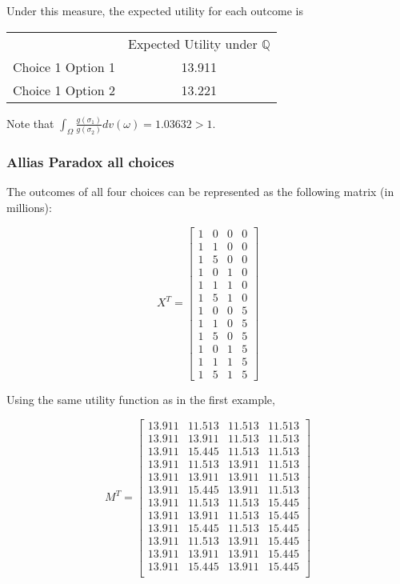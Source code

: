 \documentclass{article}
\begin{document}
Under this measure, the expected utility for each outcome is 

\begin{center} 
	\begin{tabular}{c c}
		& Expected Utility under \(\mathbb{Q}\) \\
		Choice 1 Option 1 & 13.911 \\
		Choice 1 Option 2 & 13.221 \\
	\end{tabular}
\end{center}

Note that \(\int_\Omega \frac{g(\sigma_1)}{g(\sigma_2)} dv(\omega)=1.03632 > 1\).

\subsubsection{Allias Paradox all choices}

The outcomes of all four choices can be represented as the following matrix (in millions):

\[X^T=\begin{bmatrix}
1 & 0 & 0 & 0 \\
1 & 1 & 0 & 0 \\
1 & 5 & 0 & 0 \\
1 & 0 & 1 & 0 \\
1 & 1 & 1 & 0 \\
1 & 5 & 1 & 0 \\
1 & 0 & 0 & 5 \\
1 & 1 & 0 & 5 \\
1 & 5 & 0 & 5 \\
1 & 0 & 1 & 5 \\
1 & 1 & 1 & 5 \\
1 & 5 & 1 & 5
\end{bmatrix}\]

Using the same utility function as in the first example,

\[M^T=\begin{bmatrix}
	13.911 & 11.513 & 11.513 & 11.513  \\
	13.911 & 13.911  & 11.513 & 11.513 \\
	13.911 & 15.445 & 11.513 & 11.513 \\
	13.911 & 11.513 & 13.911 & 11.513 \\
	13.911 & 13.911  & 13.911 & 11.513 \\
	13.911 & 15.445  & 13.911 & 11.513 \\
	13.911 & 11.513 & 11.513  & 15.445 \\
	13.911 & 13.911  & 11.513  & 15.445 \\
	13.911 & 15.445  & 11.513  & 15.445 \\
	13.911 & 11.513  & 13.911  & 15.445 \\
	13.911 & 13.911  & 13.911  & 15.445 \\
	13.911 & 15.445  & 13.911  & 15.445 \\
\end{bmatrix}\]
\end{document}
